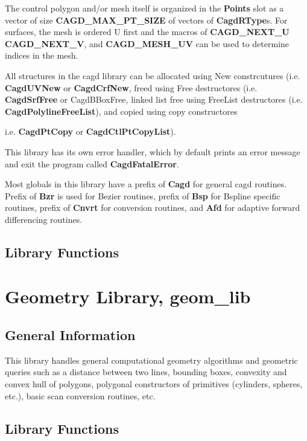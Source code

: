The control polygon and/or mesh itself is organized in the {\bf
Points} slot as a vector of size {\bf CAGD\_MAX\_PT\_SIZE} of vectors
of {\bf CagdRType}s. For surfaces, the mesh is ordered U first and the
macros of {\bf CAGD\_NEXT\_U} {\bf CAGD\_NEXT\_V}, and {\bf
CAGD\_MESH\_UV} can be used to determine indices in the mesh.

All structures in the cagd library can be allocated using New
constrcutures (i.e. {\bf CagdUVNew} or {\bf CagdCrfNew}, freed using
Free destructores (i.e. {\bf CagdSrfFree} or {CagdBBoxFree}, linked
list free using FreeList destructores (i.e. {\bf
CagdPolylineFreeList}), and copied using copy constructores {i.e. {\bf
CagdPtCopy} or {\bf CagdCtlPtCopyList}).

This library has its own error handler, which by default prints an
error message and exit the program called {\bf CagdFatalError}.

Most globals in this library have a prefix of {\bf Cagd} for general
cagd routines. Prefix of {\bf Bzr} is used for Bezier routines, prefix
of {\bf Bsp} for Bspline specific routines, prefix of {\bf Cnvrt} for
conversion routines, and {\bf Afd} for adaptive forward differencing
routines.

\section{Library Functions}


\chapter{Geometry Library, geom\_lib}

\section{General Information}

This library handles general computational geometry algorithms and
geometric queries such as a distance between two lines, bounding
boxes, convexity and convex hull of polygons, polygonal constructors
of primitives (cylinders, spheres, etc.), basic scan conversion
routines, etc.

\section{Library Functions}


}
